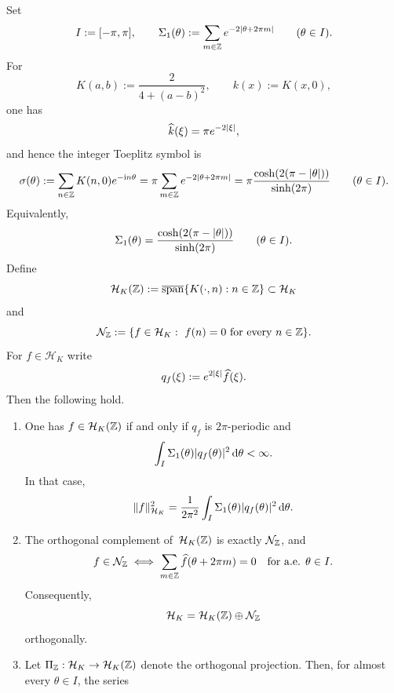 \begin{lemma}%
\label{lem:auxiliary-uniform-lattice-projection}
Set
\[
I:=[-\pi,\pi],
\qquad
\Sigma_1(\theta):=\sum_{m\in\mathbb{Z}}e^{-2\lvert \theta+2\pi m\rvert}
\qquad(\theta\in I).
\]
For
\[
K(a,b):=\frac{2}{4+(a-b)^2},
\qquad k(x):=K(x,0),
\]
one has
\[
\widehat k(\xi)=\pi e^{-2\lvert \xi\rvert},
\]
and hence the integer Toeplitz symbol is
\begin{equation}\label{eq:integer-projection-poisson-symbol}
\sigma(\theta):=\sum_{n\in\mathbb{Z}}K(n,0)e^{-\mathrm{i} n\theta}
=\pi\sum_{m\in\mathbb{Z}}e^{-2\lvert \theta+2\pi m\rvert}
=\pi\frac{\cosh(2(\pi-\lvert \theta\rvert))}{\sinh(2\pi)}
\qquad(\theta\in I).
\end{equation}
Equivalently,
\begin{equation}\label{eq:lattice-periodized-weight}
\Sigma_1(\theta)
=\frac{\cosh(2(\pi-\lvert \theta\rvert))}{\sinh(2\pi)}
\qquad(\theta\in I).
\end{equation}
Define
\[
\mathcal H_K(\mathbb{Z})
:=
\overline{\operatorname{span}}\{K(\cdot,n):n\in\mathbb{Z}\}
\subset\mathcal H_K
\]
and
\[
\mathcal N_{\mathbb{Z}}
:=
\{f\in\mathcal H_K:\ f(n)=0\ \text{for every }n\in\mathbb{Z}\}.
\]
For $f\in\mathcal H_K$ write
\[
q_f(\xi):=e^{2\lvert \xi\rvert}\widehat f(\xi).
\]
Then the following hold.
\begin{enumerate}[label=(\roman*)]
\item
      One has $f\in\mathcal H_K(\mathbb{Z})$ if and only if $q_f$ is
      $2\pi$-periodic and
      \[
      \int_I\Sigma_1(\theta)\lvert q_f(\theta)\rvert^2\,\mathrm{d}\theta<\infty.
      \]
      In that case,
      \begin{equation}\label{eq:lattice-subspace-norm}
      \|f\|_{\mathcal H_K}^2
      =\frac{1}{2\pi^2}\int_I\Sigma_1(\theta)\lvert q_f(\theta)\rvert^2\,\mathrm{d}\theta.
      \end{equation}
\item
      The orthogonal complement of~$\mathcal H_K(\mathbb{Z})$ is exactly
      $\mathcal N_{\mathbb{Z}}$, and
      \begin{equation}\label{eq:lattice-alias-cancellation}
      f\in\mathcal N_{\mathbb{Z}}
      \iff
      \sum_{m\in\mathbb{Z}}\widehat f(\theta+2\pi m)=0
      \quad\text{for a.e. }\theta\in I.
      \end{equation}
      Consequently,
      \[
      \mathcal H_K=\mathcal H_K(\mathbb{Z})\oplus \mathcal N_{\mathbb{Z}}
      \]
      orthogonally.
\item
      Let $\Pi_{\mathbb{Z}}:\mathcal H_K\to\mathcal H_K(\mathbb{Z})$ denote the
      orthogonal projection.  Then, for almost every $\theta\in I$, the
      series

\end{enumerate}
\end{lemma}
